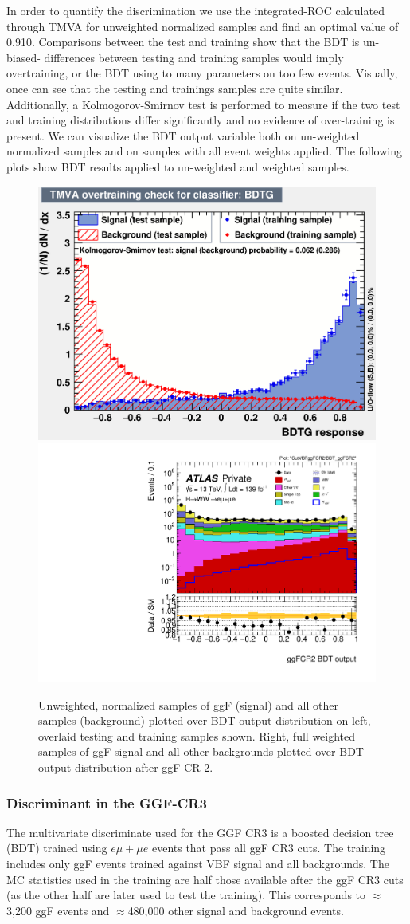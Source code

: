 In order to quantify the discrimination we use the integrated-ROC calculated through TMVA for unweighted normalized samples and find an optimal value of 0.910. Comparisons between the test and training show that the BDT is un-biased- differences between testing and training samples would imply overtraining, or the BDT using to many parameters on too few events. Visually, once can see that the testing and trainings samples are quite similar. Additionally, a Kolmogorov-Smirnov test is performed to measure if the two test and training distributions differ significantly and no evidence of over-training is present. We can visualize the BDT output variable both on un-weighted normalized samples and on samples with all event weights applied. The following plots show BDT results applied to un-weighted and weighted samples.

\begin{figure}[!htbp]
\centering
  \includegraphics[width=.45\linewidth]{Pictures/overtrain_BDTG.eps}
  \includegraphics[width=.35\linewidth]{Pictures/run2-emme-CutVBFggFCR2-BDT_ggFCR2-log.pdf}
\caption{Unweighted, normalized samples of ggF (signal) and all other samples (background) plotted over BDT output distribution on left, overlaid testing and training samples shown. Right, full weighted samples of ggF signal and all other backgrounds plotted over BDT output distribution after ggF CR 2.}
\label{fig:ggFCR2BDTresult}
\end{figure}
\subsubsection{Discriminant in the GGF-CR3}

The multivariate discriminate used for the GGF CR3 is a boosted decision tree (BDT) trained using $e\mu+\mu e$ events that pass all ggF CR3 cuts. The training includes only ggF events trained against VBF signal and all backgrounds. The MC statistics used in the training are half those available after the ggF CR3 cuts (as the other half are later used to test the training). This corresponds to $\approx$ 3,200 ggF events and $\approx$480,000 other signal and background events.

